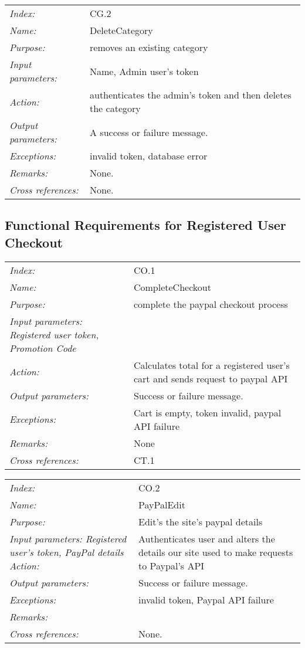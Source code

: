 \documentclass[10pt,letter]{article}
\begin{document}
\begin{tabularx}{\textwidth}{l X}
    \it{Index:} & CG.2 \\
    \it{Name:} &  DeleteCategory\\
    \it{Purpose:} & removes an existing category\\
    \it{Input parameters:} &  Name, Admin user's token\\
    \it{Action:} &  authenticates the admin's token and then deletes the category\\
    \it{Output parameters:} & A success or failure message. \\
    \it{Exceptions:} & invalid token, database error\\
    \it{Remarks:} & None. \\
    \it{Cross references:} & None. \\
    \hline
\end{tabularx}

\subsection{Functional Requirements for Registered User Checkout}

\begin{tabularx}{\textwidth}{l X}
    \it{Index:} & CO.1 \\
    \it{Name:} &  CompleteCheckout\\
    \it{Purpose:} & complete the paypal checkout process \\
    \it{Input parameters:}  Registered user token, Promotion Code\\
    \it{Action:} & Calculates total for a registered user's cart and sends request to paypal API\\
    \it{Output parameters:} & Success or failure message. \\
    \it{Exceptions:} & Cart is empty, token invalid, paypal API failure \\
    \it{Remarks:} & None\\
    \it{Cross references:} & CT.1  \\
    \hline
\end{tabularx}

\begin{tabularx}{\textwidth}{l X}
    \it{Index:} & CO.2 \\
    \it{Name:} & PayPalEdit \\
    \it{Purpose:} & Edit's the site's paypal details \\
    \it{Input parameters:}  Registered user's token, PayPal details
    \it{Action:} & Authenticates user and alters the details our site used to make requests to Paypal's API  \\
    \it{Output parameters:} & Success or failure message. \\
    \it{Exceptions:} &  invalid token, Paypal API failure \\
    \it{Remarks:} & \\
    \it{Cross references:} & None.  \\
    \hline
\end{tabularx}
\end{document}
